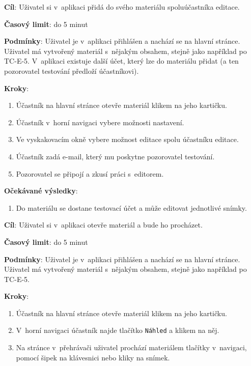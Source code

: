 \vspace{1em}

\textbf{Cíl}: Uživatel si v~aplikaci přidá do svého materiálu spoluúčastníka editace.

\textbf{Časový limit}: do 5 minut

\textbf{Podmínky}:  Uživatel je v~aplikaci přihlášen a nachází se na hlavní stránce.  Uživatel má vytvořený materiál s~nějakým obsahem, stejně jako například po TC-E-5. V~aplikaci existuje další účet, který lze do materiálu přidat (a ten pozorovatel testování předloží účastníkovi).

\textbf{Kroky}:

\begin{enumerate}[leftmargin=1.4cm]
    \item Účastník na hlavní stránce otevře materiál klikem na jeho kartičku.
    \item Účastník v~horní navigaci vybere možnosti nastavení.
    \item Ve vyskakovacím okně vybere možnost editace spolu účastníku editace.
    \item Účastník zadá e-mail, který mu poskytne pozorovatel testování.
    \item Pozorovatel se připojí a zkusí práci s~editorem.
\end{enumerate}

\textbf{Očekávané výsledky}:

\begin{enumerate}[leftmargin=1.4cm]
    \item Do materiálu se dostane testovací účet a může editovat jednotlivé snímky.
\end{enumerate}






\vspace{1em}

\textbf{Cíl}: Uživatel si v~aplikaci otevře materiál a bude ho procházet.

\textbf{Časový limit}: do 5 minut

\textbf{Podmínky}:  Uživatel je v~aplikaci přihlášen a nachází se na hlavní stránce.  Uživatel má vytvořený materiál s~nějakým obsahem, stejně jako například po TC-E-5.

\textbf{Kroky}:

\begin{enumerate}[leftmargin=1.4cm]
    \item Účastník na hlavní stránce otevře materiál klikem na jeho kartičku.
    \item V~horní navigaci účastník najde tlačítko \verb|Náhled| a klikem na něj.
    \item Na stránce v~přehrávači uživatel prochází materiálem tlačítky v~navigaci, pomocí šipek na klávesnici nebo kliky na snímek.
\end{enumerate}

